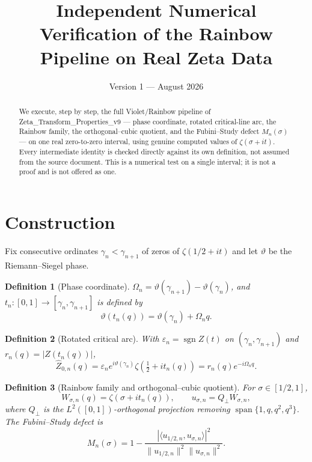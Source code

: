\documentclass[11pt]{amsart}
\title{Independent Numerical Verification of the Rainbow Pipeline on Real Zeta Data}
\author{}
\date{Version 1 --- August 2026}
\newtheorem{definition}{Definition}
\begin{document}
\maketitle

\begin{abstract}
We execute, step by step, the full Violet/Rainbow pipeline of Zeta\_Transform\_Properties\_v9
--- phase coordinate, rotated critical-line arc, the Rainbow family, the
orthogonal--cubic quotient, and the Fubini--Study defect $M_n(\sigma)$ ---
on one real zero-to-zero interval, using genuine computed values of
$\zeta(\sigma+it)$. Every intermediate identity is checked directly against
its own definition, not assumed from the source document. This is a
numerical test on a single interval; it is not a proof and is not offered
as one.
\end{abstract}

\section{Construction}
\label{sec:construction}

Fix consecutive ordinates $\gamma_n<\gamma_{n+1}$ of zeros of
$\zeta(1/2+it)$ and let $\vartheta$ be the Riemann--Siegel phase.

\begin{definition}[Phase coordinate]
$\Omega_n=\vartheta(\gamma_{n+1})-\vartheta(\gamma_n)$, and $t_n:[0,1]\to[\gamma_n,\gamma_{n+1}]$ is defined by
\begin{equation}
\vartheta(t_n(q))=\vartheta(\gamma_n)+\Omega_n q.
\label{eq:tn}
\end{equation}
\end{definition}

\begin{definition}[Rotated critical arc]
With $\varepsilon_n=\operatorname{sgn}Z(t)$ on $(\gamma_n,\gamma_{n+1})$ and $r_n(q)=|Z(t_n(q))|$,
\begin{equation}
\widehat Z_{0,n}(q)=\varepsilon_n e^{i\vartheta(\gamma_n)}\zeta\!\left(\tfrac12+it_n(q)\right)=r_n(q)e^{-i\Omega_nq}.
\label{eq:rotated}
\end{equation}
\end{definition}

\begin{definition}[Rainbow family and orthogonal--cubic quotient]
For $\sigma\in[1/2,1]$,
\begin{equation}
W_{\sigma,n}(q)=\zeta(\sigma+it_n(q)),\qquad
u_{\sigma,n}=Q_\perp W_{\sigma,n},
\label{eq:Wsigma}
\end{equation}
where $Q_\perp$ is the $L^2([0,1])$-orthogonal projection removing
$\operatorname{span}\{1,q,q^2,q^3\}$. The Fubini--Study defect is
\begin{equation}
M_n(\sigma)=1-\frac{|\langle u_{1/2,n},u_{\sigma,n}\rangle|^2}
{\|u_{1/2,n}\|^2\|u_{\sigma,n}\|^2}.
\label{eq:Mn}
\end{equation}
\end{definition}
\end{document}
